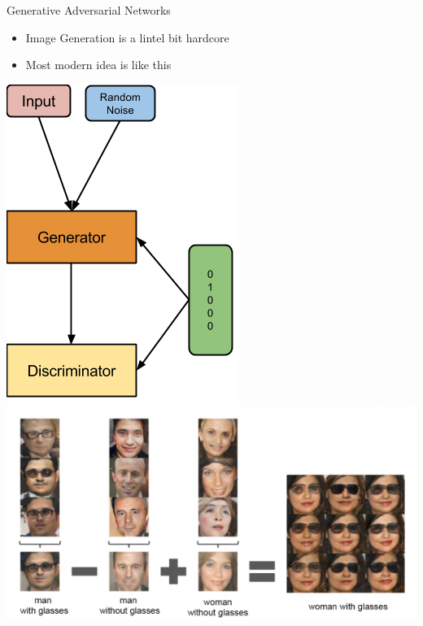 \documentclass{beamer}
\begin{document}
\begin{frame}{Generative Adversarial Networks}
	\begin{itemize}
		\item Image Generation is a lintel bit hardcore
		\item Most modern idea is like this
	\end{itemize}
	\begin{center}
		\includegraphics[scale=0.3]{img/gan2}
		\includegraphics[scale=0.4]{img/gan1}
	\end{center}
\end{frame}
\end{document}
